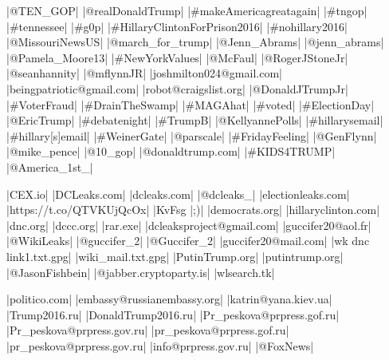 |@TEN_GOP|
|@realDonaldTrump|
|#makeAmericagreatagain|
|#tngop|
|#tennessee|
|#g0p|
|#HillaryClintonForPrison2016|
|#nohillary2016|
|@MissouriNewsUS|
|@march_for_trump|
|@Jenn_Abrams|
|@jenn_abrams|
|@Pamela_Moore13|
|#NewYorkValues|
|@McFaul|
|@RogerJStoneJr|
|@seanhannity|
|@mflynnJR|
|joshmilton024@gmail.com|
|beingpatriotic@gmail.com|
|robot@craigslist.org|
|@DonaldJTrumpJr|
|#VoterFraud|
|#DrainTheSwamp|
|#MAGAhat|
|#voted|
|#ElectionDay|
|@EricTrump|
|#debatenight|
|#TrumpB|
|@KellyannePolls|
|#hillarysemail|
|#hillary[s]email|
|#WeinerGate|
|@parscale|
|#FridayFeeling|
|@GenFlynn|
|@mike_pence|
|@10_gop|
|@donaldtrump.com|
|#KIDS4TRUMP|
|@America_1st_|

|CEX.io|
|DCLeaks.com|
|dcleaks.com|
|@dcleaks_|
|electionleaks.com|
|https://t.co/QTVKUjQcOx|
|KvFsg%
|;)|
|democrats.org|
|hillaryclinton.com|
|dnc.org|
|dccc.org|
|rar.exe|
|dcleaksproject@gmail.com|
|guccifer20@aol.fr|
|@WikiLeaks|
|@guccifer_2|
|@Guccifer_2|
|guccifer20@mail.com|
|wk dnc link1.txt.gpg|
|wiki_mail.txt.gpg|
|PutinTrump.org|
|putintrump.org|
|@JasonFishbein|
|@jabber.cryptoparty.is|
|wlsearch.tk|

|politico.com|
|embassy@russianembassy.org|
|katrin@yana.kiev.ua|
|Trump2016.ru|
|DonaldTrump2016.ru|
|Pr_peskova@prpress.gof.ru|
|Pr_peskova@prpress.gov.ru|
|pr_peskova@prpress.gof.ru|
|pr_peskova@prpress.gov.ru|
|info@prpress.gov.ru|
|@FoxNews|
